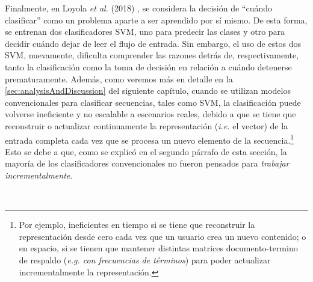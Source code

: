 Finalmente, en Loyola \emph{et al.} (2018) \cite{loyola2018learning}, se considera la decisión de ``cuándo clasificar'' como un problema aparte a ser aprendido por sí mismo.
De esta forma, se entrenan dos clasificadores \ac{SVM}, uno para predecir las clases y otro para decidir cuándo dejar de leer el flujo de entrada.
Sin embargo, el uso de estos dos \ac{SVM}, nuevamente, dificulta comprender las razones detrás de, respectivamente, tanto la clasificación como la toma de decisión en relación a cuándo detenerse prematuramente.
Además, como veremos más en detalle en la \autoref{sec:analysisAndDiscussion} del siguiente capítulo, cuando se utilizan modelos convencionales para clasificar secuencias, tales como \ac{SVM}, la clasificación puede volverse ineficiente y no escalable a escenarios reales, debido a que se tiene que reconstruir o actualizar continuamente la representación (\emph{i.e.} el vector) de la entrada completa cada vez que se procesa un nuevo elemento de la secuencia.\footnote{Por ejemplo, ineficientes en tiempo si se tiene que reconstruir la representación desde cero cada vez que un usuario crea un nuevo contenido; o en espacio, si se tienen que mantener distintas matrices documento-termino de respaldo (\emph{e.g. con frecuencias de términos}) para poder actualizar incrementalmente la representación.} Esto se debe a que, como se explicó en el segundo párrafo de esta sección, la mayoría de los clasificadores convencionales no fueron pensados para \emph{trabajar incrementalmente}.

\

